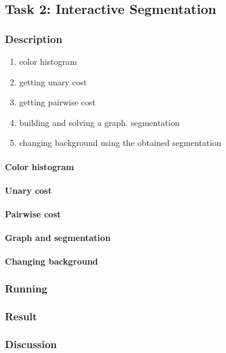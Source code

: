 \documentclass[paper=a4, fontsize=11pt]{scrartcl} %
\numberwithin{equation}{section} %
\numberwithin{figure}{section} %
\numberwithin{table}{section} %
\begin{document}
\subsection{Task 2: Interactive Segmentation}

\subsubsection{Description}

\begin{enumerate}
	\item color histogram 
	\item getting unary cost
	\item getting pairwise cost
	\item building and solving a graph. segmentation 
	\item changing background using the obtained segmentation 
\end{enumerate}


\paragraph{Color histogram}

\paragraph{Unary cost}

\paragraph{Pairwise cost}

\paragraph{Graph and segmentation}

\paragraph{Changing background}

\subsubsection{Running}

\subsubsection{Result}

\subsubsection{Discussion}
\end{document}
